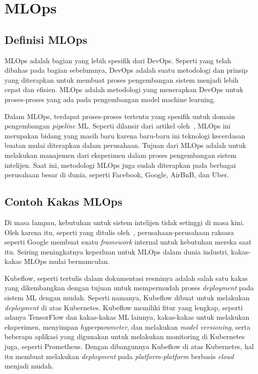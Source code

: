\section{MLOps}


\subsection{Definisi MLOps}

MLOps adalah bagian yang lebih spesifik dari DevOps. 
Seperti yang telah dibahas pada bagian sebelumnya, DevOps adalah suatu metodologi dan prinsip yang diterapkan untuk membuat proses pengembangan sistem menjadi lebih cepat dan efisien. 
MLOps adalah metodologi yang menerapkan DevOps untuk proses-proses yang ada pada pengembangan model machine learning.

Dalam MLOps, terdapat proses-proses tertentu yang spesifik untuk domain pengembangan \textit{pipeline} ML.
Seperti dilansir dari artikel oleh~\cite{mlops}, MLOps ini merupakan bidang yang masih baru karena baru-baru ini teknologi kecerdasan buatan mulai diterapkan dalam perusahaan.
Tujuan dari MLOps adalah untuk melakukan manajemen dari eksperimen dalam proses pengembangan sistem intelijen.
Saat ini, metodologi MLOps juga sudah diterapkan pada berbagai perusahaan besar di dunia, seperti Facebook, Google, AirBnB, dan Uber.

\subsection{Contoh Kakas MLOps}

Di masa lampau, kebutuhan untuk sistem intelijen tidak setinggi di masa kini. 
Oleh karena itu, seperti yang ditulis oleh~\cite{mlops}, perusahaan-perusahaan raksasa seperti Google membuat suatu \textit{framework} internal untuk kebutuhan mereka saat itu.
Seiring meningkatnya keperluan untuk MLOps dalam dunia industri, kakas-kakas MLOps mulai bermunculan.

Kubeflow, seperti tertulis dalam dokumentasi resminya adalah salah satu kakas yang dikembangkan dengan tujuan untuk mempermudah proses \textit{deployment} pada sistem ML dengan mudah.
Seperti namanya, Kubeflow dibuat untuk melakukan \textit{deployment} di atas Kubernetes.
Kubeflow memiliki fitur yang lengkap, seperti adanya TensorFlow dan kakas-kakas ML lainnya, kakas-kakas untuk melakukan eksperimen, menyimpan \textit{hyperparameter}, dan melakukan \textit{model versioning}, serta beberapa aplikasi yang digunakan untuk melakukan monitoring di Kubernetes juga, seperti Prometheus.
Dengan dibangunnya Kubeflow di atas Kubernetes, hal itu membuat melakukan  \textit{deployment} pada \textit{platform-platform} berbasis \textit{cloud} menjadi mudah.

